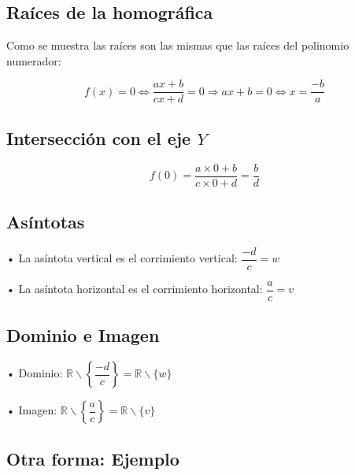\newpage
\subsection{Raíces de la homográfica}

Como se muestra las raíces son las mismas que las raíces del polinomio numerador:

$$f(x)= 0 \Leftrightarrow \dfrac{ax+b}{cx+d}=0 \Rightarrow ax+b = 0 \Leftrightarrow x = \dfrac{-b}{a}$$

\subsection{Intersección con el eje $Y$}
$$f(0) = \dfrac{a\times 0+b}{c\times 0+d}
= \dfrac{b}{d}$$
\subsection{Asíntotas}

• La asíntota vertical es el corrimiento vertical: $\dfrac{-d}{c} = w$

• La asíntota horizontal es el corrimiento horizontal: $\dfrac{a}{c} = v$

\subsection{Dominio e Imagen}

• Dominio: $\mathbb{R}\smallsetminus \left\{\dfrac{-d}{c}\right\} =
\mathbb{R}\smallsetminus \{w\} $

• Imagen: $\mathbb{R}\smallsetminus \left\{\dfrac{a}{c}\right\} = 
\mathbb{R}\smallsetminus \{v\}$

\subsection{Otra forma: Ejemplo}

